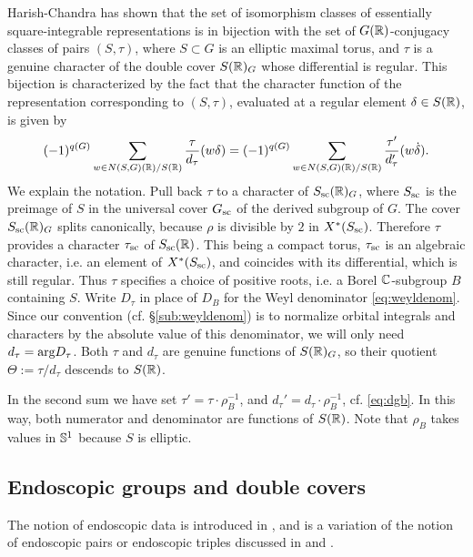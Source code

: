 \documentclass{article}
\theoremstyle{definition}
\numberwithin{equation}{section}
\renewcommand{\-}{\hyp{}}
\begin{document}
Harish-Chandra has shown that the set of isomorphism classes of essentially square-integrable representations is in bijection with the set of $G(\mathbb{R})$-conjugacy classes of pairs $(S,\tau)$, where $S \subset G$ is an elliptic maximal torus, and $\tau$ is a genuine character of the double cover $S(\mathbb{R})_G$ whose differential is regular. This bijection is characterized by the fact that the character function of the representation corresponding to $(S,\tau)$, evaluated at a regular element $\delta \in S(\mathbb{R})$, is given by
\begin{equation} \label{eq:charfmla}
(-1)^{q(G)}\sum_{w \in N(S,G)(\mathbb{R})/S(\mathbb{R})} \frac{\tau}{d_\tau}(w\delta) = (-1)^{q(G)}\sum_{w \in N(S,G)(\mathbb{R})/S(\mathbb{R})} \frac{\tau'}{d'_\tau}(w\dot\delta).
\end{equation}
We explain the notation. Pull back $\tau$ to a character of $S_{\textrm{sc}}(\mathbb{R})_G$, where $S_{\textrm{sc}}$ is the preimage of $S$ in the universal cover $G_{\textrm{sc}}$ of the derived subgroup of $G$. The cover $S_{\textrm{sc}}(\mathbb{R})_G$ splits canonically, because $\rho$ is divisible by $2$ in $X^*(S_{\textrm{sc}})$. Therefore $\tau$ provides a character $\tau_{\textrm{sc}}$ of $S_{\textrm{sc}}(\mathbb{R})$. This being a compact torus, $\tau_{\textrm{sc}}$ is an algebraic character, i.e. an element of $X^*(S_{\textrm{sc}})$, and coincides with its differential, which is still regular. Thus $\tau$ specifies a choice of positive roots, i.e. a Borel $\mathbb{C}$-subgroup $B$ containing $S$. Write $D_\tau$ in place of $D_B$ for the Weyl denominator \eqref{eq:weyldenom}. Since our convention (cf. \S\ref{sub:weyldenom}) is to normalize orbital integrals and characters by the absolute value of this denominator, we will only need $d_\tau=\textrm{arg}D_\tau$. Both $\tau$ and $d_\tau$ are genuine functions of $S(\mathbb{R})_G$, so their quotient $\Theta:=\tau/d_\tau$ descends to $S(\mathbb{R})$.

In the second sum we have set $\tau'=\tau \cdot \rho_B^{-1}$, and $d_\tau'=d_\tau \cdot \rho_B^{-1}$, cf. \eqref{eq:dgb}. In this way, both numerator and denominator are functions of $S(\mathbb{R})$. Note that $\rho_B$ takes values in $\mathbb{S}^1$ because $S$ is elliptic.

\subsection{Endoscopic groups and double covers} \label{sub:covendo}

The notion of endoscopic data is introduced in \cite[\S1.2]{LS87}, and is a variation of the notion of endoscopic pairs or endoscopic triples discussed in \cite{Kot84} and \cite{Kot86}.
\end{document}
